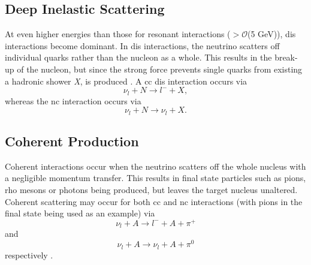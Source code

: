 \newpage
\subsection*{Deep Inelastic Scattering}
At even higher energies than those for resonant interactions ($>\mathcal{O}$(5 GeV)), \gls{dis} interactions become dominant. In \gls{dis} interactions, the neutrino scatters off individual quarks rather than the nucleon as a whole. This results in the break-up of the nucleon, but since the strong force prevents single quarks from existing a hadronic shower \textit{X}, is produced \cite{Fundamentals_of_Neutrino_Physics_and_Astrophysics} \cite{Measurement_of_the_Antineutrino_Double-Differential_Charged-Current_Quasi-Elastic_Scattering_Cross_Section_at_MINERvA_book}. A \gls{cc} \gls{dis} interaction occurs via
\begin{equation}
    \nu_l + N \rightarrow l^- + X,
\end{equation}
whereas the \gls{nc} interaction occurs via
\begin{equation}
    \nu_l + N \rightarrow \nu_l + X.
\end{equation}


\subsection*{Coherent Production}
Coherent interactions occur when the neutrino scatters off the whole nucleus with a negligible momentum transfer. This results in final state particles such as pions, rho mesons or photons being produced, but leaves the target nucleus unaltered. Coherent scattering may occur for both \gls{cc} and \gls{nc} interactions (with pions in the final state being used as an example) via
\begin{equation}
    \nu_l + A \rightarrow l^- + A + \pi^+
\end{equation}
and
\begin{equation}
    \nu_l + A \rightarrow \nu_l + A + \pi^0
\end{equation}
respectively \cite{Measurement_of_the_Water_to_Scintillator_Charged-Current_Cross-Section_Ratio_for_Muon_Neutrinos_at_the_T2K_Near_Detector_thesis}\cite{Adjusting_neutrino_interaction_models_and_evaluating_uncertainties_using_NOvA_near_detector_data}. 

